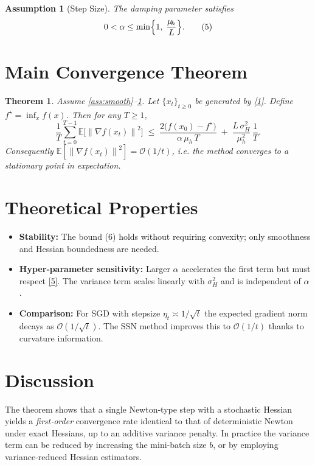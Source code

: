 \documentclass{article}
\newtheorem{theorem}{Theorem}
\newtheorem{assumption}{Assumption}
\newcommand{\E}{\mathbb{E}}
\newcommand{\norm}[1]{\left\|#1\right\|}
\begin{document}
\begin{assumption}[Step Size]\label{ass:stepsize}
The damping parameter satisfies
\[
0<\alpha\le \min\Bigl\{1,\;\frac{\mu_{\!h}}{L}\Bigr\}.
\tag{5}
\]
\end{assumption}

\section*{Main Convergence Theorem}
\begin{theorem}\label{thm:main}
Assume \ref{ass:smooth}–\ref{ass:stepsize}. Let $\{x_t\}_{t\ge0}$ be generated by \eqref{1}. Define $f^{\star}= \inf_{x}f(x)$. Then for any $T\ge1$,
\[
\frac{1}{T}\sum_{t=0}^{T-1}\E\!\bigl[\norm{\nabla f(x_t)}^{2}\bigr]
\;\le\;
\frac{2\bigl(f(x_0)-f^{\star}\bigr)}{\alpha\,\mu_{\!h}\,T}
\;+\;
\frac{L\,\sigma_{H}^{2}}{\mu_{\!h}^{2}}\,\frac{1}{T}.
\tag{6}
\]
Consequently $\E[\norm{\nabla f(x_t)}^{2}]=\mathcal{O}(1/t)$, i.e. the method converges to a stationary point in expectation.
\end{theorem}

\section*{Theoretical Properties}
\begin{itemize}
    \item \textbf{Stability:} The bound (6) holds without requiring convexity; only smoothness and Hessian boundedness are needed.
    \item \textbf{Hyper‑parameter sensitivity:} Larger $\alpha$ accelerates the first term but must respect \eqref{5}. The variance term scales linearly with $\sigma_H^{2}$ and is independent of $\alpha$.
    \item \textbf{Comparison:} For SGD with stepsize $\eta_t\asymp 1/\sqrt{t}$ the expected gradient norm decays as $\mathcal{O}(1/\sqrt{t})$. The SSN method improves this to $\mathcal{O}(1/t)$ thanks to curvature information.
\end{itemize}

\section*{Discussion}
The theorem shows that a single Newton‑type step with a stochastic Hessian yields a \emph{first‑order} convergence rate identical to that of deterministic Newton under exact Hessians, up to an additive variance penalty.  In practice the variance term can be reduced by increasing the mini‑batch size $b$, or by employing variance‑reduced Hessian estimators.
\end{document}
